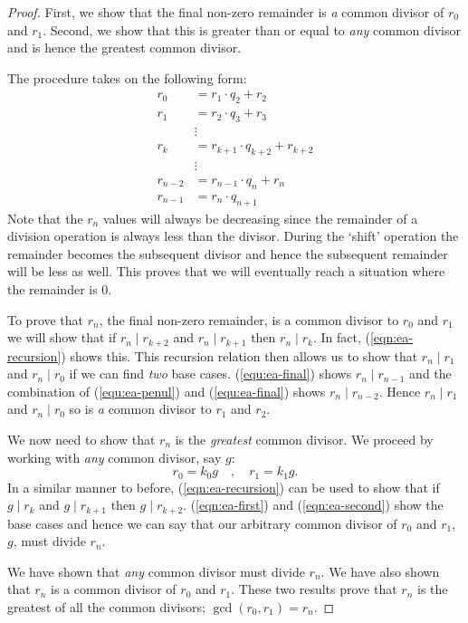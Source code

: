 \documentclass[]{scrartcl}
\theoremstyle{definition}
\let\oldref\ref
\renewcommand{\ref}[1]{(\oldref{#1})}
\begin{document}
\begin{proof}
    First, we show that the final non-zero remainder is \textit{a} common divisor of $r_0$ and $r_1$. Second, we show that this is greater than or equal to \textit{any} common divisor and is hence the greatest common divisor.
    
    The procedure takes on the following form:
    \begin{align}
        r_0 &= r_1 \cdot q_2 + r_2 \label{eqn:ea-first} \\
        r_1 &= r_2 \cdot q_3 + r_3 \label{eqn:ea-second} \\
        &\vdots \nonumber\\
        r_k &= r_{k+1} \cdot q_{k+2} + r_{k+2} \label{eqn:ea-recursion}\\
        &\vdots \nonumber\\
        r_{n-2} &= r_{n-1} \cdot q_n + r_n \label{equ:ea-penul} \\
        r_{n-1} &= r_n \cdot q_{n+1} \label{equ:ea-final}
    \end{align}
    Note that the $r_n$ values will always be decreasing since the remainder of a division operation is always less than the divisor. During the `shift' operation the remainder becomes the subsequent divisor and hence the subsequent remainder will be less as well. This proves that we will eventually reach a situation where the remainder is 0.

    To prove that $r_n$, the final non-zero remainder, is a common divisor to $r_0$ and $r_1$ we will show that if $r_n\mid r_{k+2}$ and $r_n\mid r_{k+1}$ then $r_n \mid r_k$. In fact, \ref{eqn:ea-recursion} shows this. This recursion relation then allows us to show that $r_n \mid r_1$ and $r_n \mid r_0$ if we can find \textit{two} base cases. \ref{equ:ea-final} shows $r_n \mid r_{n-1}$ and the combination of \ref{equ:ea-penul} and \ref{equ:ea-final} shows $r_n \mid r_{n-2}$. Hence $r_n \mid r_1$ and $r_n \mid r_0$ so is \textit{a} common divisor to $r_1$ and $r_2$.

    We now need to show that $r_n$ is the \textit{greatest} common divisor. We proceed by working with \textit{any} common divisor, say $g$:
    \begin{equation}
        r_0 = k_0 g \quad, \quad r_1 = k_1g.
    \end{equation}
    In a similar manner to before, \ref{eqn:ea-recursion} can be used to show that if $g \mid r_k$ and $g \mid r_{k+1}$ then $g \mid r_{k+2}$. \ref{eqn:ea-first} and \ref{eqn:ea-second} show the base cases and hence we can say that our arbitrary common divisor of $r_0$ and $r_1$, $g$, must divide $r_n$.

    We have shown that \textit{any} common divisor must divide $r_n$. We have also shown that $r_n$ is a common divisor of $r_0$ and $r_1$. These two results prove that $r_n$ is the greatest of all the common divisors; $\gcd(r_0, r_1) = r_n$.
\end{proof}
\end{document}
